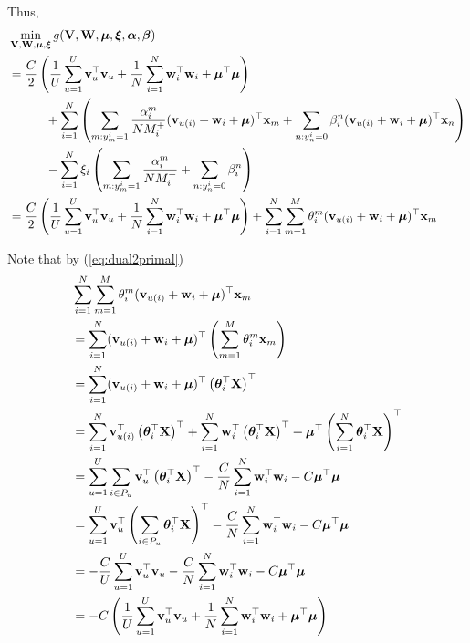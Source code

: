 Thus,
\begin{equation*}
\begin{aligned}
&\min_{\mathbf{V}, \mathbf{W}, \bm{\mu}, \bm{\xi}} g(\mathbf{V}, \mathbf{W}, \bm{\mu}, \bm{\xi}, {\bm{\alpha}}, {\bm{\beta}}) \\
&= \frac{C}{2} \left( \frac{1}{U} \sum_{u=1}^U \mathbf{v}_u^\top \mathbf{v}_u 
     + \frac{1}{N} \sum_{i=1}^N \mathbf{w}_i^\top \mathbf{w}_i + \bm{\mu}^\top \bm{\mu} \right) \\
& \hspace{3em}
     + \sum_{i=1}^N \left( 
       \sum_{m: y_m^i = 1} \frac{\alpha_i^m}{N M_i^+} (\mathbf{v}_{u(i)} + \mathbf{w}_i + \bm{\mu})^\top \mathbf{x}_m 
     + \sum_{n: y_n^i = 0} \beta_i^n (\mathbf{v}_{u(i)} + \mathbf{w}_i + \bm{\mu})^\top \mathbf{x}_n \right) \\
& \hspace{3em}
     - \sum_{i=1}^N \xi_i \left( \sum_{m: y_m^i = 1} \frac{\alpha_i^m}{N M_i^+} + \sum_{n: y_n^i = 0} \beta_i^n \right) \\
&= \frac{C}{2} \left( \frac{1}{U} \sum_{u=1}^U \mathbf{v}_u^\top \mathbf{v}_u 
     + \frac{1}{N} \sum_{i=1}^N \mathbf{w}_i^\top \mathbf{w}_i + \bm{\mu}^\top \bm{\mu} \right)
     + \sum_{i=1}^N \sum_{m=1}^M \theta_i^m (\mathbf{v}_{u(i)} + \mathbf{w}_i + \bm{\mu})^\top \mathbf{x}_m
\end{aligned}
\end{equation*}

Note that by (\ref{eq:dual2primal})
\begin{equation*}
\begin{aligned}
&\sum_{i=1}^N \sum_{m=1}^M \theta_i^m (\mathbf{v}_{u(i)} + \mathbf{w}_i + \bm{\mu})^\top \mathbf{x}_m \\
&= \sum_{i=1}^N (\mathbf{v}_{u(i)} + \mathbf{w}_i + \bm{\mu})^\top \left( \sum_{m=1}^M \theta_i^m \mathbf{x}_m \right) \\
&= \sum_{i=1}^N (\mathbf{v}_{u(i)} + \mathbf{w}_i + \bm{\mu})^\top \left( \bm{\theta}_i^\top \mathbf{X} \right)^\top \\
&= \sum_{i=1}^N \mathbf{v}_{u(i)}^\top \left( \bm{\theta}_i^\top \mathbf{X} \right)^\top 
     + \sum_{i=1}^N \mathbf{w}_i^\top \left( \bm{\theta}_i^\top \mathbf{X} \right)^\top 
     + \bm{\mu}^\top \left( \sum_{i=1}^N \bm{\theta}_i^\top \mathbf{X} \right)^\top \\
&= \sum_{u=1}^U \sum_{i \in P_u} \mathbf{v}_u^\top \left( \bm{\theta}_i^\top \mathbf{X} \right)^\top
     - \frac{C}{N} \sum_{i=1}^N \mathbf{w}_i^\top \mathbf{w}_i 
     - C \bm{\mu}^\top \bm{\mu} \\
&= \sum_{u=1}^U \mathbf{v}_u^\top \left( \sum_{i \in P_u} \bm{\theta}_i^\top \mathbf{X} \right)^\top
     - \frac{C}{N} \sum_{i=1}^N \mathbf{w}_i^\top \mathbf{w}_i 
     - C \bm{\mu}^\top \bm{\mu} \\
&= -\frac{C}{U} \sum_{u=1}^U \mathbf{v}_u^\top \mathbf{v}_u
     - \frac{C}{N} \sum_{i=1}^N \mathbf{w}_i^\top \mathbf{w}_i 
     - C \bm{\mu}^\top \bm{\mu} \\
&= -C \left( \frac{1}{U} \sum_{u=1}^U \mathbf{v}_u^\top \mathbf{v}_u
     + \frac{1}{N} \sum_{i=1}^N \mathbf{w}_i^\top \mathbf{w}_i 
     + \bm{\mu}^\top \bm{\mu} \right)
\end{aligned}
\end{equation*}

